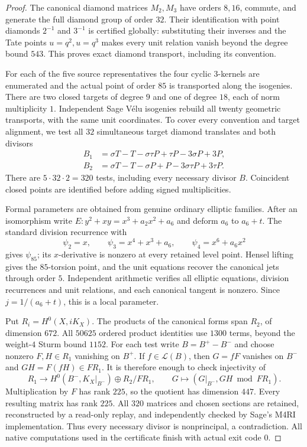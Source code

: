 \begin{proof}
The canonical diamond matrices $M_2,M_3$ have orders $8,16$, commute, and generate the full diamond group of order $32$. Their identification with point diamonds $2^{-1}$ and $3^{-1}$ is certified globally: substituting their inverses and the Tate points $u=q^2,u=q^3$ makes every unit relation vanish beyond the degree bound $543$. This proves exact diamond transport, including its convention.

For each of the five source representatives the four cyclic $3$-kernels are enumerated and the actual point of order $85$ is transported along the isogenies. There are two closed targets of degree $9$ and one of degree $18$, each of norm multiplicity $1$. Independent Sage V\'elu isogenies rebuild all twenty geometric transports, with the same unit coordinates. To cover every convention and target alignment, we test all $32$ simultaneous target diamond translates and both divisors
\[
 \begin{split}
 B_1&=\sigma T-T-\sigma\tau P+\tau P-3\sigma P+3P,\\
 B_2&=\sigma T-T-\sigma P+P-3\sigma\tau P+3\tau P.
 \end{split}
\]
There are $5\cdot32\cdot2=320$ tests, including every necessary divisor $B$. Coincident closed points are identified before adding signed multiplicities.

Formal parameters are obtained from genuine ordinary elliptic families. After an isomorphism write $E:y^2+xy=x^3+a_2x^2+a_6$ and deform $a_6$ to $a_6+t$. The standard division recurrence with
\[
 \psi_2=x,\qquad\psi_3=x^4+x^3+a_6,\qquad\psi_4=x^6+a_6x^2
\]
gives $\psi_{85}$; its $x$-derivative is nonzero at every retained level point. Hensel lifting gives the $85$-torsion point, and the unit equations recover the canonical jets through order $5$. Independent arithmetic verifies all elliptic equations, division recurrences and unit relations, and each canonical tangent is nonzero. Since $j=1/(a_6+t)$, this is a local parameter.

Put $R_i=H^0(X,iK_X)$. The products of the canonical forms span $R_2$, of dimension $672$. All $50625$ ordered product identities use $1300$ terms, beyond the weight-$4$ Sturm bound $1152$. For each test write $B=B^+-B^-$ and choose nonzero $F,H\in R_1$ vanishing on $B^+$. If $f\in\mathcal L(B)$, then $G=fF$ vanishes on $B^-$ and $GH=F(fH)\in FR_1$. It is therefore enough to check injectivity of
\[
 R_1\longrightarrow H^0(B^-,K_X|_{B^-})\oplus R_2/FR_1,
 \qquad G\longmapsto(G|_{B^-},GH\bmod FR_1).
\]
Multiplication by $F$ has rank $225$, so the quotient has dimension $447$. Every resulting matrix has rank $225$. All $320$ matrices and chosen sections are retained, reconstructed by a read-only replay, and independently checked by Sage's M4RI implementation. Thus every necessary divisor is nonprincipal, a contradiction. All native computations used in the certificate finish with actual exit code $0$.
\end{proof}
